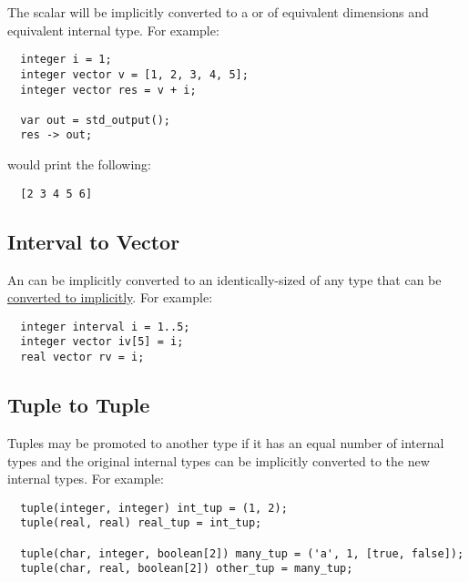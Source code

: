 \documentclass[../gazprea.tex]{subfiles}
\begin{document}
The scalar will be implicitly converted to a  or  of equivalent dimensions
and equivalent internal type. For example:
\begin{lstlisting}
  integer i = 1;
  integer vector v = [1, 2, 3, 4, 5];
  integer vector res = v + i;

  var out = std_output();
  res -> out;
\end{lstlisting}

would print the following:
\begin{lstlisting}
  [2 3 4 5 6]
\end{lstlisting}

\subsection{Interval to Vector}
\label{ssec:typePromotion_ivltov}
An  can be implicitly converted to an identically-sized  of any type that 
can be \hyperref[ssec:typePromotion_scalar]{converted to implicitly}. For example:
\begin{lstlisting}
  integer interval i = 1..5;
  integer vector iv[5] = i;
  real vector rv = i;
\end{lstlisting}

\subsection{Tuple to Tuple}
\label{ssec:typePromotion_ttot}
Tuples may be promoted to another type if it has an equal number of internal types and the original
internal types can be implicitly converted to the new internal types. For example:
\begin{lstlisting}
  tuple(integer, integer) int_tup = (1, 2);
  tuple(real, real) real_tup = int_tup;

  tuple(char, integer, boolean[2]) many_tup = ('a', 1, [true, false]);
  tuple(char, real, boolean[2]) other_tup = many_tup;
\end{lstlisting}
\end{document}
